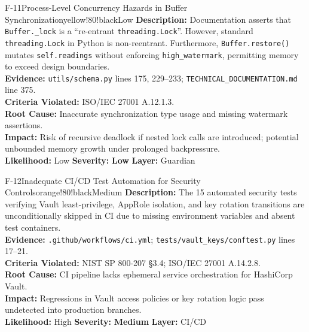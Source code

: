 \documentclass[10pt,a4paper]{report}
\begin{document}
\begin{findingbox}{F-11}{Process-Level Concurrency Hazards in Buffer Synchronization}{yellow!80!black}{Low}
\textbf{Description:} Documentation asserts that \texttt{Buffer.\_lock} is a ``re-entrant \texttt{threading.Lock}''. However, standard \texttt{threading.Lock} in Python is non-reentrant. Furthermore, \texttt{Buffer.restore()} mutates \texttt{self.readings} without enforcing \texttt{high\_watermark}, permitting memory to exceed design boundaries.\\
\textbf{Evidence:} \texttt{utils/schema.py} lines 175, 229--233; \texttt{TECHNICAL\_DOCUMENTATION.md} line 375.\\
\textbf{Criteria Violated:} ISO/IEC 27001 A.12.1.3.\\
\textbf{Root Cause:} Inaccurate synchronization type usage and missing watermark assertions.\\
\textbf{Impact:} Risk of recursive deadlock if nested lock calls are introduced; potential unbounded memory growth under prolonged backpressure.\\
\textbf{Likelihood:} Low \quad \textbar \quad \textbf{Severity:} \textbf{Low} \quad \textbar \quad \textbf{Layer:} Guardian
\end{findingbox}

\begin{findingbox}{F-12}{Inadequate CI/CD Test Automation for Security Controls}{orange!80!black}{Medium}
\textbf{Description:} The 15 automated security tests verifying Vault least-privilege, AppRole isolation, and key rotation transitions are unconditionally skipped in CI due to missing environment variables and absent test containers.\\
\textbf{Evidence:} \texttt{.github/workflows/ci.yml}; \texttt{tests/vault\_keys/conftest.py} lines 17--21.\\
\textbf{Criteria Violated:} NIST SP 800-207 §3.4; ISO/IEC 27001 A.14.2.8.\\
\textbf{Root Cause:} CI pipeline lacks ephemeral service orchestration for HashiCorp Vault.\\
\textbf{Impact:} Regressions in Vault access policies or key rotation logic pass undetected into production branches.\\
\textbf{Likelihood:} High \quad \textbar \quad \textbf{Severity:} \textbf{Medium} \quad \textbar \quad \textbf{Layer:} CI/CD
\end{findingbox}
\end{document}

